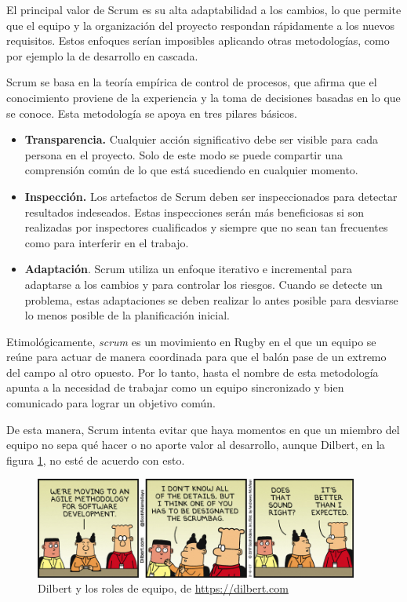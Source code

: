 El principal valor de Scrum es su alta adaptabilidad a los cambios, lo que permite que el equipo y la organización del proyecto respondan rápidamente a los nuevos requisitos. Estos enfoques serían imposibles aplicando otras metodologías, como por ejemplo la de desarrollo en cascada.

Scrum se basa en la teoría empírica de control de procesos, que afirma que el conocimiento proviene de la experiencia y la toma de decisiones basadas en lo que se conoce. Esta metodología se apoya en tres pilares básicos.

\begin{itemize}
    \item \textbf{Transparencia.} Cualquier acción significativo debe ser visible para cada persona en el proyecto. Solo de este modo se puede compartir una comprensión común de lo que está sucediendo en cualquier momento.
    
    \item \textbf{Inspección.} Los artefactos de Scrum deben ser inspeccionados para detectar resultados indeseados. Estas inspecciones serán más beneficiosas si son realizadas por inspectores cualificados y siempre que no sean tan frecuentes como para interferir en el trabajo.

    \item \textbf{Adaptación}. Scrum utiliza un enfoque iterativo e incremental para adaptarse a los cambios y para controlar los riesgos. Cuando se detecte un problema, estas adaptaciones se deben realizar lo antes posible para desviarse lo menos posible de la planificación inicial.
\end{itemize}

Etimológicamente, \textit{scrum} es un movimiento en Rugby en el que un equipo se reúne para actuar de manera coordinada para que el balón pase de un extremo del campo al otro opuesto. Por lo tanto, hasta el nombre de esta metodología apunta a la necesidad de trabajar como un equipo sincronizado y bien comunicado para lograr un objetivo común.

De esta manera, Scrum intenta evitar que haya momentos en que un miembro del equipo no sepa qué hacer o no aporte valor al desarrollo, aunque Dilbert, en la figura \ref{fig:dilbert}, no esté de acuerdo con esto.

\begin{figure}[!h]
\begin{center}
\includegraphics[width=0.95\textwidth]{imagenes/5/dilbert.jpg}
\caption{Dilbert y los roles de equipo, de \url{https://dilbert.com}}
\label{fig:dilbert}
\end{center}
\end{figure}

